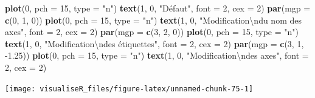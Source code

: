 \documentclass[]{article}
\newenvironment{Shaded}{\begin{snugshade}}{\end{snugshade}}
\newcommand{\CharTok}[1]{\textcolor[rgb]{0.31,0.60,0.02}{#1}}
\newcommand{\DataTypeTok}[1]{\textcolor[rgb]{0.13,0.29,0.53}{#1}}
\newcommand{\DecValTok}[1]{\textcolor[rgb]{0.00,0.00,0.81}{#1}}
\newcommand{\FloatTok}[1]{\textcolor[rgb]{0.00,0.00,0.81}{#1}}
\newcommand{\KeywordTok}[1]{\textcolor[rgb]{0.13,0.29,0.53}{\textbf{#1}}}
\newcommand{\NormalTok}[1]{#1}
\newcommand{\StringTok}[1]{\textcolor[rgb]{0.31,0.60,0.02}{#1}}
\begin{document}
\begin{Shaded}
\begin{Highlighting}[]
\KeywordTok{plot}\NormalTok{(}\DecValTok{0}\NormalTok{, }\DataTypeTok{pch =} \DecValTok{15}\NormalTok{, }\DataTypeTok{type =} \StringTok{"n"}\NormalTok{)}
\KeywordTok{text}\NormalTok{(}\DecValTok{1}\NormalTok{, }\DecValTok{0}\NormalTok{, }\StringTok{"Défaut"}\NormalTok{, }\DataTypeTok{font =} \DecValTok{2}\NormalTok{, }\DataTypeTok{cex =} \DecValTok{2}\NormalTok{)}
\KeywordTok{par}\NormalTok{(}\DataTypeTok{mgp =} \KeywordTok{c}\NormalTok{(}\DecValTok{0}\NormalTok{, }\DecValTok{1}\NormalTok{, }\DecValTok{0}\NormalTok{))}
\KeywordTok{plot}\NormalTok{(}\DecValTok{0}\NormalTok{, }\DataTypeTok{pch =} \DecValTok{15}\NormalTok{, }\DataTypeTok{type =} \StringTok{"n"}\NormalTok{)}
\KeywordTok{text}\NormalTok{(}\DecValTok{1}\NormalTok{, }\DecValTok{0}\NormalTok{, }\StringTok{"Modification}\CharTok{\textbackslash{}n}\StringTok{du nom des axes"}\NormalTok{, }\DataTypeTok{font =} \DecValTok{2}\NormalTok{, }\DataTypeTok{cex =} \DecValTok{2}\NormalTok{)}
\KeywordTok{par}\NormalTok{(}\DataTypeTok{mgp =} \KeywordTok{c}\NormalTok{(}\DecValTok{3}\NormalTok{, }\DecValTok{2}\NormalTok{, }\DecValTok{0}\NormalTok{))}
\KeywordTok{plot}\NormalTok{(}\DecValTok{0}\NormalTok{, }\DataTypeTok{pch =} \DecValTok{15}\NormalTok{, }\DataTypeTok{type =} \StringTok{"n"}\NormalTok{)}
\KeywordTok{text}\NormalTok{(}\DecValTok{1}\NormalTok{, }\DecValTok{0}\NormalTok{, }\StringTok{"Modification}\CharTok{\textbackslash{}n}\StringTok{des étiquettes"}\NormalTok{, }\DataTypeTok{font =} \DecValTok{2}\NormalTok{, }\DataTypeTok{cex =} \DecValTok{2}\NormalTok{)}
\KeywordTok{par}\NormalTok{(}\DataTypeTok{mgp =} \KeywordTok{c}\NormalTok{(}\DecValTok{3}\NormalTok{, }\DecValTok{1}\NormalTok{, }\FloatTok{-1.25}\NormalTok{))}
\KeywordTok{plot}\NormalTok{(}\DecValTok{0}\NormalTok{, }\DataTypeTok{pch =} \DecValTok{15}\NormalTok{, }\DataTypeTok{type =} \StringTok{"n"}\NormalTok{)}
\KeywordTok{text}\NormalTok{(}\DecValTok{1}\NormalTok{, }\DecValTok{0}\NormalTok{, }\StringTok{"Modification}\CharTok{\textbackslash{}n}\StringTok{des axes"}\NormalTok{, }\DataTypeTok{font =} \DecValTok{2}\NormalTok{, }\DataTypeTok{cex =} \DecValTok{2}\NormalTok{)}
\end{Highlighting}
\end{Shaded}

\begin{center}\texttt{[image: visualiseR\_files/figure-latex/unnamed-chunk-75-1]} \end{center}
\end{document}
